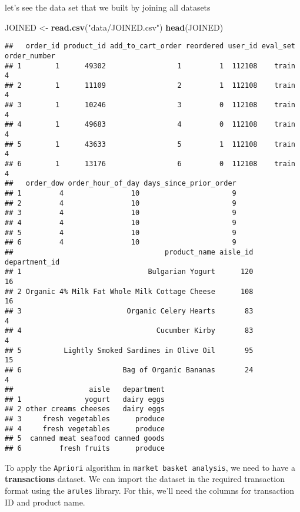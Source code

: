 \documentclass[
]{article}
\newenvironment{Shaded}{\begin{snugshade}}{\end{snugshade}}
\newcommand{\FunctionTok}[1]{\textcolor[rgb]{0.13,0.29,0.53}{\textbf{#1}}}
\newcommand{\NormalTok}[1]{#1}
\newcommand{\OtherTok}[1]{\textcolor[rgb]{0.56,0.35,0.01}{#1}}
\newcommand{\StringTok}[1]{\textcolor[rgb]{0.31,0.60,0.02}{#1}}
\begin{document}
let's see the data set that we built by joining all datasets

\begin{Shaded}
\begin{Highlighting}[]
\NormalTok{JOINED }\OtherTok{\textless{}{-}} \FunctionTok{read.csv}\NormalTok{(}\StringTok{"data/JOINED.csv"}\NormalTok{)}
\FunctionTok{head}\NormalTok{(JOINED)}
\end{Highlighting}
\end{Shaded}

\begin{verbatim}
##   order_id product_id add_to_cart_order reordered user_id eval_set order_number
## 1        1      49302                 1         1  112108    train            4
## 2        1      11109                 2         1  112108    train            4
## 3        1      10246                 3         0  112108    train            4
## 4        1      49683                 4         0  112108    train            4
## 5        1      43633                 5         1  112108    train            4
## 6        1      13176                 6         0  112108    train            4
##   order_dow order_hour_of_day days_since_prior_order
## 1         4                10                      9
## 2         4                10                      9
## 3         4                10                      9
## 4         4                10                      9
## 5         4                10                      9
## 6         4                10                      9
##                                    product_name aisle_id department_id
## 1                              Bulgarian Yogurt      120            16
## 2 Organic 4% Milk Fat Whole Milk Cottage Cheese      108            16
## 3                         Organic Celery Hearts       83             4
## 4                                Cucumber Kirby       83             4
## 5          Lightly Smoked Sardines in Olive Oil       95            15
## 6                        Bag of Organic Bananas       24             4
##                  aisle   department
## 1               yogurt   dairy eggs
## 2 other creams cheeses   dairy eggs
## 3     fresh vegetables      produce
## 4     fresh vegetables      produce
## 5  canned meat seafood canned goods
## 6         fresh fruits      produce
\end{verbatim}

To apply the \texttt{Apriori} algorithm in
\texttt{market\ basket\ analysis}, we need to have a
\textbf{transactions} dataset. We can import the dataset in the required
transaction format using the \texttt{arules} library. For this, we'll
need the columns for transaction ID and product name.
\end{document}
